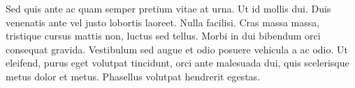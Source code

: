 Sed quis ante ac quam semper pretium vitae at urna. Ut id mollis dui.
Duis venenatis ante vel justo lobortis laoreet. Nulla facilisi. Cras
massa massa, tristique cursus mattis non, luctus sed tellus. Morbi in
dui bibendum orci consequat gravida. Vestibulum sed augue et odio
posuere vehicula a ac odio. Ut eleifend, purus eget volutpat
tincidunt, orci ante malesuada dui, quis scelerisque metus dolor et
metus. Phasellus volutpat hendrerit egestas.
